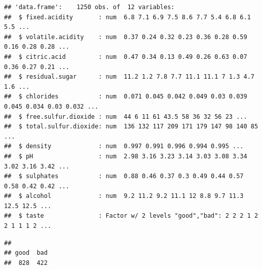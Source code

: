 \documentclass[
  spanish,
]{book}
\newenvironment{Shaded}{\begin{snugshade}}{\end{snugshade}}
\newcommand{\AttributeTok}[1]{\textcolor[rgb]{0.77,0.63,0.00}{#1}}
\newcommand{\CommentTok}[1]{\textcolor[rgb]{0.56,0.35,0.01}{\textit{#1}}}
\newcommand{\DecValTok}[1]{\textcolor[rgb]{0.00,0.00,0.81}{#1}}
\newcommand{\FunctionTok}[1]{\textcolor[rgb]{0.00,0.00,0.00}{#1}}
\newcommand{\NormalTok}[1]{#1}
\newcommand{\OtherTok}[1]{\textcolor[rgb]{0.56,0.35,0.01}{#1}}
\newcommand{\SpecialCharTok}[1]{\textcolor[rgb]{0.00,0.00,0.00}{#1}}
\newcommand{\StringTok}[1]{\textcolor[rgb]{0.31,0.60,0.02}{#1}}
\theoremstyle{break}
\theoremstyle{definition}
\theoremstyle{definition}
\theoremstyle{definition}
\theoremstyle{definition}
\theoremstyle{remark}
\begin{document}
\begin{Shaded}
\end{Shaded}

\begin{verbatim}
## 'data.frame':    1250 obs. of  12 variables:
##  $ fixed.acidity       : num  6.8 7.1 6.9 7.5 8.6 7.7 5.4 6.8 6.1 5.5 ...
##  $ volatile.acidity    : num  0.37 0.24 0.32 0.23 0.36 0.28 0.59 0.16 0.28 0.28 ...
##  $ citric.acid         : num  0.47 0.34 0.13 0.49 0.26 0.63 0.07 0.36 0.27 0.21 ...
##  $ residual.sugar      : num  11.2 1.2 7.8 7.7 11.1 11.1 7 1.3 4.7 1.6 ...
##  $ chlorides           : num  0.071 0.045 0.042 0.049 0.03 0.039 0.045 0.034 0.03 0.032 ...
##  $ free.sulfur.dioxide : num  44 6 11 61 43.5 58 36 32 56 23 ...
##  $ total.sulfur.dioxide: num  136 132 117 209 171 179 147 98 140 85 ...
##  $ density             : num  0.997 0.991 0.996 0.994 0.995 ...
##  $ pH                  : num  2.98 3.16 3.23 3.14 3.03 3.08 3.34 3.02 3.16 3.42 ...
##  $ sulphates           : num  0.88 0.46 0.37 0.3 0.49 0.44 0.57 0.58 0.42 0.42 ...
##  $ alcohol             : num  9.2 11.2 9.2 11.1 12 8.8 9.7 11.3 12.5 12.5 ...
##  $ taste               : Factor w/ 2 levels "good","bad": 2 2 2 1 2 2 1 1 1 2 ...
\end{verbatim}

\begin{Shaded}
\end{Shaded}

\begin{verbatim}
## 
## good  bad 
##  828  422
\end{verbatim}
\end{document}

